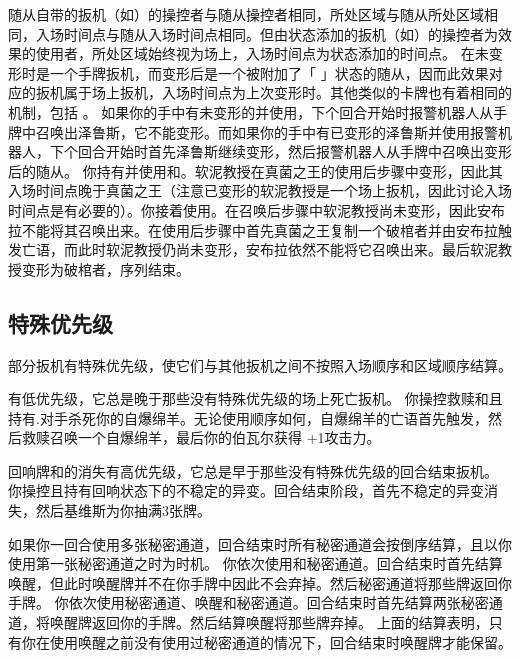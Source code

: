 随从自带的扳机（如）的操控者与随从操控者相同，所处区域与随从所处区域相同，入场时间点与随从入场时间点相同。但由状态添加的扳机（如）的操控者为效果的使用者，所处区域始终视为场上，入场时间点为状态添加的时间点。
\notice {}在未变形时是一个手牌扳机，而变形后是一个被附加了「 」状态的随从，因而此效果对应的扳机属于场上扳机，入场时间点为上次变形时。其他类似的卡牌也有着相同的机制，包括 。
\example 如果你的手中有未变形的并使用，下个回合开始时报警机器人从手牌中召唤出泽鲁斯，它不能变形。而如果你的手中有已变形的泽鲁斯并使用报警机器人，下个回合开始时首先泽鲁斯继续变形，然后报警机器人从手牌中召唤出变形后的随从。
\example 你持有并使用和。软泥教授在真菌之王的使用后步骤中变形，因此其入场时间点晚于真菌之王（注意已变形的软泥教授是一个场上扳机，因此讨论入场时间点是有必要的）。你接着使用。在召唤后步骤中软泥教授尚未变形，因此安布拉不能将其召唤出来。在使用后步骤中首先真菌之王复制一个破棺者并由安布拉触发亡语，而此时软泥教授仍尚未变形，安布拉依然不能将它召唤出来。最后软泥教授变形为破棺者，序列结束。

\subsection{特殊优先级}
\label{special-priority}

部分扳机有特殊优先级，使它们与其他扳机之间不按照入场顺序和区域顺序结算。

有低优先级，它总是晚于那些没有特殊优先级的场上死亡扳机。
\example 你操控救赎和且持有.对手杀死你的自爆绵羊。无论使用顺序如何，自爆绵羊的亡语首先触发，然后救赎召唤一个自爆绵羊，最后你的伯瓦尔获得 +1攻击力。

回响牌和的消失有高优先级，它总是早于那些没有特殊优先级的回合结束扳机。
\example 你操控且持有回响状态下的不稳定的异变。回合结束阶段，首先不稳定的异变消失，然后基维斯为你抽满3张牌。

如果你一回合使用多张秘密通道，回合结束时所有秘密通道会按倒序结算，且以你使用第一张秘密通道之时为时机。
\example 你依次使用和秘密通道。回合结束时首先结算唤醒，但此时唤醒牌并不在你手牌中因此不会弃掉。然后秘密通道将那些牌返回你手牌。
\example 你依次使用秘密通道、唤醒和秘密通道。回合结束时首先结算两张秘密通道，将唤醒牌返回你的手牌。然后结算唤醒将那些牌弃掉。
\notice 上面的结算表明，只有你在使用唤醒之前没有使用过秘密通道的情况下，回合结束时唤醒牌才能保留。

